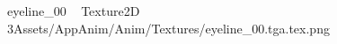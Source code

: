 
   eyeline_00             	   Texture2D
   3   Assets/AppAnim/Anim/Textures/eyeline_00.tga.tex.png